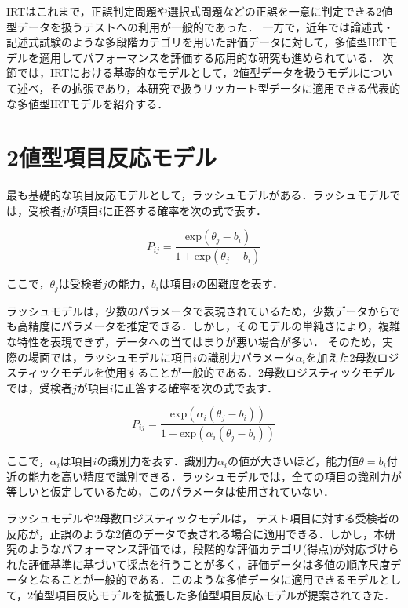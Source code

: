 \documentclass[a4paper,11pt,oneside,openany]{jsbook}
\begin{document}
IRTはこれまで，正誤判定問題や選択式問題などの正誤を一意に判定できる2値型データを扱うテストへの利用が一般的であった． 一方で，近年では論述式・記述式試験のような多段階カテゴリを用いた評価データに対して，多値型IRTモデルを適用してパフォーマンスを評価する応用的な研究も進められている\cite{IRTMatteucci,IRTDeCarlo}．
次節では，IRTにおける基礎的なモデルとして，2値型データを扱うモデルについて述べ，その拡張であり，本研究で扱うリッカート型データに適用できる代表的な多値型IRTモデルを紹介する．

\section{2値型項目反応モデル}
最も基礎的な項目反応モデルとして，ラッシュモデル\cite{rash}がある．ラッシュモデルでは，受検者$j$が項目$i$に正答する確率を次の式で表す．

\begin{displaymath}
P_{ij} = \frac{\mathrm{exp}(\theta_{j}-b_{i})}{1 + \mathrm{exp}(\theta_{j}-b_{i})}
\end{displaymath}

ここで，$\theta_{j}$は受検者$j$の能力，$b_{i}$は項目$i$の困難度を表す．

ラッシュモデルは，少数のパラメータで表現されているため，少数データからでも高精度にパラメータを推定できる\cite{rashbenefit}．しかし，そのモデルの単純さにより，複雑な特性を表現できず，データへの当てはまりが悪い場合が多い\cite{rashloss}．
そのため，実際の場面では，ラッシュモデルに項目$i$の識別力パラメータ$\alpha_{i}$を加えた2母数ロジスティックモデルを使用することが一般的である．2母数ロジスティックモデルでは，受検者$j$が項目$i$に正答する確率を次の式で表す．

\begin{displaymath}
  P_{ij} = \frac{\mathrm{exp}(\alpha_{i}(\theta_{j}-b_{i}))}{1 + \mathrm{exp}(\alpha_{i}(\theta_{j}-b_{i}))}
  \end{displaymath}
  
ここで，$\alpha_{i}$は項目$i$の識別力を表す．識別力$\alpha_{i}$の値が大きいほど，能力値$\theta = b_i$付近の能力を高い精度で識別できる．ラッシュモデルでは，全ての項目の識別力が等しいと仮定しているため，このパラメータは使用されていない．

ラッシュモデルや2母数ロジスティックモデルは， テスト項目に対する受検者の反応が，正誤のような2値のデータで表される場合に適用できる．しかし，本研究のようなパフォーマンス評価では，段階的な評価カテゴリ(得点)が対応づけられた評価基準に基づいて採点を行うことが多く，評価データは多値の順序尺度データとなることが一般的である．このような多値データに適用できるモデルとして，2値型項目反応モデルを拡張した多値型項目反応モデルが提案されてきた．
\end{document}
